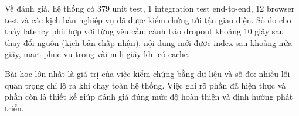 Về đánh giá, hệ thống có 379 unit test, 1 integration test end-to-end, 12 browser test và các kịch bản nghiệp vụ đã được kiểm chứng tới tận giao diện. Số đo cho thấy latency phù hợp với từng yêu cầu: cảnh báo dropout khoảng 10 giây sau thay đổi nguồn (kịch bản chấp nhận), nội dung mới được index sau khoảng nửa giây, mart phục vụ trong vài mili-giây khi có cache.

Bài học lớn nhất là giá trị của việc kiểm chứng bằng dữ liệu và số đo: nhiều lỗi quan trọng chỉ lộ ra khi chạy toàn hệ thống. Việc ghi rõ phần đã hiện thực và phần còn là thiết kế giúp đánh giá đúng mức độ hoàn thiện và định hướng phát triển.
